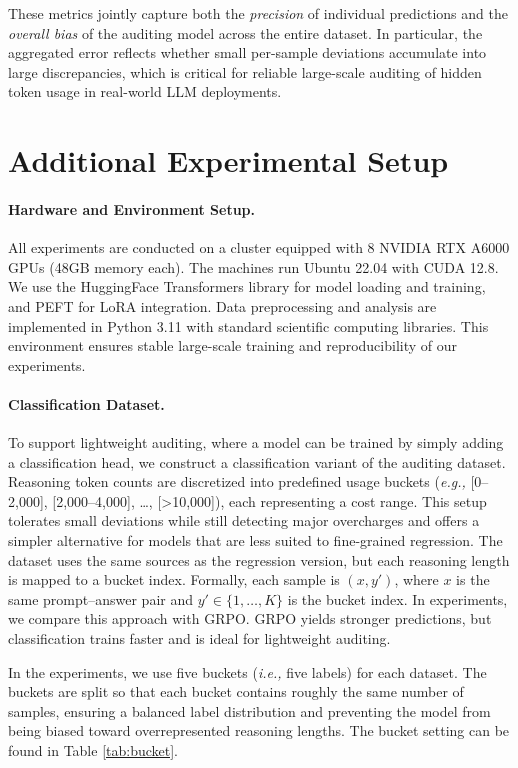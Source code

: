 \documentclass[pdflatex,sn-mathphys-num]{sn-jnl}%
\newcommand{\eg}{\textit{e.g., }}
\newcommand{\ie}{\textit{i.e., }}
\theoremstyle{thmstyleone}%
\theoremstyle{thmstyletwo}%
\theoremstyle{thmstylethree}%
\begin{document}
These metrics jointly capture both the \textit{precision} of individual predictions and the \textit{overall bias} of the auditing model across the entire dataset. In particular, the aggregated error reflects whether small per-sample deviations accumulate into large discrepancies, which is critical for reliable large-scale auditing of hidden token usage in real-world LLM deployments.

\section{Additional Experimental Setup}
\paragraph{Hardware and Environment Setup.}
All experiments are conducted on a cluster equipped with 8 NVIDIA RTX A6000 GPUs (48GB memory each).
The machines run Ubuntu 22.04 with CUDA 12.8.
We use the HuggingFace Transformers library for model loading and training, and PEFT for LoRA integration.
Data preprocessing and analysis are implemented in Python 3.11 with standard scientific computing libraries.
This environment ensures stable large-scale training and reproducibility of our experiments.

\paragraph{Classification Dataset.} To support lightweight auditing, where a model can be trained by simply adding a classification head, we construct a classification variant of the auditing dataset. Reasoning token counts are discretized into predefined usage buckets (\eg [0–2,000], [2,000–4,000], …, [\textgreater 10,000]), each representing a cost range. This setup tolerates small deviations while still detecting major overcharges and offers a simpler alternative for models that are less suited to fine-grained regression. The dataset uses the same sources as the regression version, but each reasoning length is mapped to a bucket index. Formally, each sample is \((x, y')\), where \(x\) is the same prompt–answer pair and \(y' \in \{1, \dots, K\}\) is the bucket index. In experiments, we compare this approach with GRPO. GRPO yields stronger predictions, but classification trains faster and is ideal for lightweight auditing.

In the experiments, we use five buckets (\ie five labels) for each dataset. The buckets are split so that each bucket contains roughly the same number of samples, ensuring a balanced label distribution and preventing the model from being biased toward overrepresented reasoning lengths. The bucket setting can be found in Table \ref{tab:bucket}.
\end{document}
